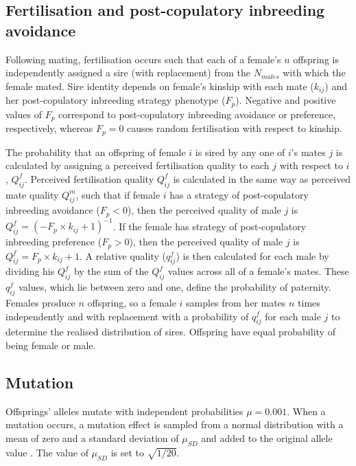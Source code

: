 \documentclass[10pt,letterpaper]{article}
\begin{document}
\subsection*{Fertilisation and post-copulatory inbreeding avoidance}

Following mating, fertilisation occurs such that each of a female's $n$ offspring is independently assigned a sire (with replacement) from the $N_{males}$ with which the female mated. Sire identity depends on female's kinship with each mate ($k_{ij}$) and her post-copulatory inbreeding strategy phenotype ($F_{p}$). Negative and positive values of $F_{p}$ correspond to post-copulatory inbreeding avoidance or preference, respectively, whereas $F_{p}=0$ causes random fertilisation with respect to kinship.

The probability that an offspring of female $i$ is sired by any one of $i$'s mates $j$ is calculated by assigning a perceived fertilisation quality to each $j$ with respect to $i$, $Q^{f}_{ij}$. Perceived fertilisation quality $Q^{f}_{ij}$ is calculated in the same way as perceived mate quality $Q^{m}_{ij}$, such that if female $i$ has a strategy of post-copulatory inbreeding avoidance ($F_{p}<0$), then the perceived quality of male $j$ is $Q^{f}_{ij} = (-F_{p} \times k_{ij} + 1)^{-1}$. If the female has strategy of post-copulatory inbreeding preference ($F_{p}>0$), then the perceived quality of male $j$ is $Q^{f}_{ij} = F_{p} \times k_{ij} + 1$. A relative quality ($q^{f}_{ij}$) is then calculated for each male by dividing his $Q^{f}_{ij}$ by the sum of the $Q^{f}_{ij}$ values across all of a female's mates. These $q^{f}_{ij}$ values, which lie between zero and one, define the probability of paternity. Females produce $n$ offspring, so a female $i$ samples from her mates $n$ times independently and with replacement with a probability of $q^{f}_{ij}$ for each male $j$ to determine the realised distribution of sires. Offspring have equal probability of being female or male.

\subsection*{Mutation}

Offsprings' alleles mutate with independent probabilities $\mu=0.001$. When a mutation occurs, a mutation effect is sampled from a normal distribution with a mean of zero and a standard deviation of $\mu_{SD}$ and added to the original allele value \cite[][]{Kimura1965, Lande1976, Bocedi2014, Duthie}. The value of $\mu_{SD}$ is set to $\sqrt{1/20}$.
\end{document}
